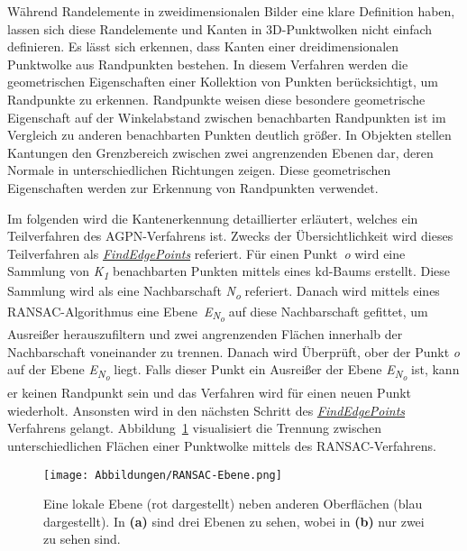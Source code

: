 Während Randelemente in zweidimensionalen Bilder eine klare Definition haben, lassen sich diese Randelemente und Kanten in 3D-Punktwolken nicht einfach definieren. Es lässt sich erkennen, dass Kanten einer dreidimensionalen Punktwolke aus Randpunkten bestehen. In diesem Verfahren werden die geometrischen Eigenschaften einer Kollektion von Punkten berücksichtigt, um Randpunkte zu erkennen. Randpunkte weisen diese besondere geometrische Eigenschaft auf \textendash{} der Winkelabstand zwischen benachbarten Randpunkten ist im Vergleich zu anderen benachbarten Punkten deutlich größer. In Objekten stellen Kantungen den Grenzbereich zwischen zwei angrenzenden Ebenen dar, deren Normale in unterschiedlichen Richtungen zeigen. Diese geometrischen Eigenschaften werden zur Erkennung von Randpunkten verwendet. \autocite[1-2]{ni_edge_2016}

Im folgenden wird die Kantenerkennung detaillierter erläutert, welches ein Teilverfahren des AGPN-Verfahrens ist. Zwecks der Übersichtlichkeit wird dieses Teilverfahren als \textit{\hyperref[alg:find_edge_points]{FindEdgePoints}} referiert. Für einen Punkt~\textit{o} wird eine Sammlung von \textit{K\textsubscript{1}} benachbarten Punkten mittels eines kd-Baums erstellt. Diese Sammlung wird als eine Nachbarschaft \textit{N\textsubscript{o}} referiert. Danach wird mittels eines RANSAC-Algorithmus eine Ebene~\textit{E\textsubscript{N\textsubscript{o}}} auf diese Nachbarschaft gefittet, um Ausreißer herauszufiltern und zwei angrenzenden Flächen innerhalb der Nachbarschaft voneinander zu trennen. Danach wird Überprüft, ober der Punkt \textit{o} auf der Ebene \textit{E\textsubscript{N\textsubscript{o}}} liegt. Falls dieser Punkt ein Ausreißer der Ebene \textit{E\textsubscript{N\textsubscript{o}}} ist, kann er keinen Randpunkt sein und das Verfahren wird für einen neuen Punkt wiederholt. Ansonsten wird in den nächsten Schritt des \textit{\hyperref[alg:find_edge_points]{FindEdgePoints}} Verfahrens gelangt. Abbildung~\ref{RANSAC-Ebene} visualisiert die Trennung zwischen unterschiedlichen Flächen einer Punktwolke mittels des RANSAC-Verfahrens. 

\begin{figure}[h]
	\texttt{[image: Abbildungen/RANSAC-Ebene.png]}
	\centering
	\caption[Trennung mehrerer Ebenen mit RANSAC]{Eine lokale Ebene (rot dargestellt) neben anderen Oberflächen (blau dargestellt). In \textbf{(a)} sind drei Ebenen zu sehen, wobei in \textbf{(b)} nur zwei zu sehen sind. \autocite{ni_edge_2016}}
	\label{RANSAC-Ebene}
\end{figure} 

